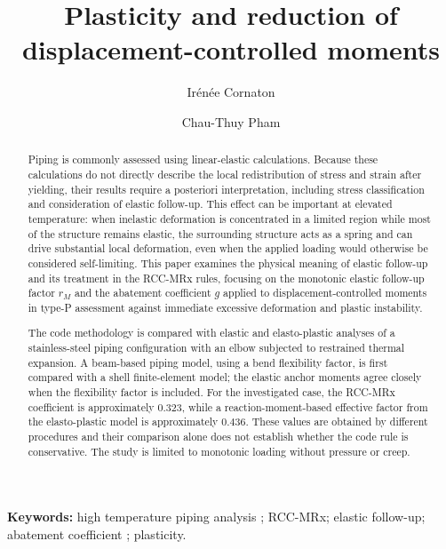 \documentclass[10pt,a4paper]{article}
\title{\textbf{Plasticity and reduction of displacement-controlled moments}}
\author[1]{Ir\'en\'ee Cornaton}
\author[1]{Chau-Thuy Pham}
\affil[1]{\textbf{Octave}}
\date{}
\begin{document}
\maketitle

\begin{abstract}
Piping is commonly assessed using linear-elastic calculations. Because these calculations do not directly describe the local redistribution of stress and strain after yielding, their results require a posteriori interpretation, including stress classification and consideration of elastic follow-up. This effect can be important at elevated temperature: when inelastic deformation is concentrated in a limited region while most of the structure remains elastic, the surrounding structure acts as a spring and can drive substantial local deformation, even when the applied loading would otherwise be considered self-limiting. This paper examines the physical meaning of elastic follow-up and its treatment in the RCC-MRx rules, focusing on the monotonic elastic follow-up factor $r_M$ and the abatement coefficient $g$ applied to displacement-controlled moments in type-P assessment against immediate excessive deformation and plastic instability.

The code methodology is compared with elastic and elasto-plastic analyses of a stainless-steel piping configuration with an elbow subjected to restrained thermal expansion. A beam-based piping model, using a bend flexibility factor, is first compared with a shell finite-element model; the elastic anchor moments agree closely when the flexibility factor is included. For the investigated case, the RCC-MRx coefficient is approximately $0.323$, while a reaction-moment-based effective factor from the elasto-plastic model is approximately $0.436$. These values are obtained by different procedures and their comparison alone does not establish whether the code rule is conservative. The study is limited to monotonic loading without pressure or creep.
\end{abstract}

\vspace{2\baselineskip}

\noindent\textbf{Keywords:} high temperature piping analysis ; RCC-MRx; elastic follow-up; abatement coefficient ;  plasticity.

\clearpage
\end{document}
